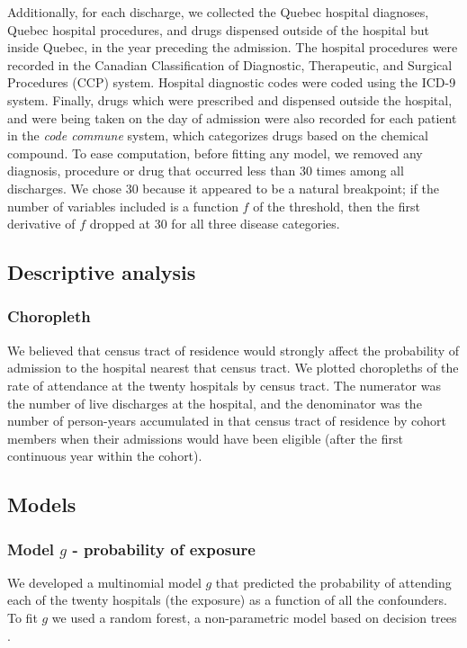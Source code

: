 \documentclass[]{article}\usepackage[]{graphicx}\usepackage[]{color}
\begin{document}
Additionally, for each discharge, we collected the Quebec hospital diagnoses, Quebec hospital procedures, and drugs dispensed outside of the hospital but inside Quebec, in the year preceding the admission. The hospital procedures were recorded in the Canadian Classification of Diagnostic, Therapeutic, and Surgical Procedures (CCP) system. Hospital diagnostic codes were coded using the ICD-9 system. Finally, drugs which were prescribed and dispensed outside the hospital, and were being taken on the day of admission were also recorded for each patient in the \emph{code commune} system, which categorizes drugs based on the chemical compound. To ease computation, before fitting any model, we removed any diagnosis, procedure or drug that occurred less than 30 times among all discharges. We chose 30 because it appeared to be a natural breakpoint; if the number of variables included is a function $f$ of the threshold, then the first derivative of $f$ dropped at 30 for all three disease categories.

\subsection{Descriptive analysis}

\subsubsection{Choropleth}
We believed that census tract of residence would strongly affect the probability of admission to the hospital nearest that census tract. We plotted choropleths of the rate of attendance at the twenty hospitals by census tract. The numerator was the number of live discharges at the hospital, and the denominator was the number of person-years accumulated in that census tract of residence by cohort members when their admissions would have been eligible (after the first continuous year within the cohort).

\subsection{Models}
\subsubsection{Model $g$ - probability of exposure}
We developed a multinomial model $g$ that predicted the probability of attending each of the twenty hospitals (the exposure) as a function of all the confounders. To fit $g$ we used a random forest, a non-parametric model based on decision trees \supercite{breiman_random_2001}. 
\end{document}
